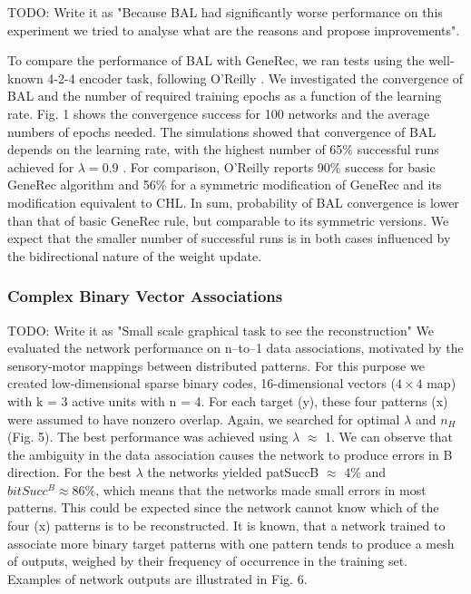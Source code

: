 TODO: Write it as "Because BAL had significantly worse performance on this experiment we tried to analyse what are the reasons and propose improvements". 

To compare the performance of BAL with GeneRec, we ran tests using the well-
known 4-2-4 encoder task, following O’Reilly \cite{o1996bio}. We investigated the convergence
of BAL and the number of required training epochs as a function of the learning
rate. Fig. 1 shows the convergence success for 100 networks and the average
numbers of epochs needed. The simulations showed that convergence of BAL
depends on the learning rate, with the highest number of 65\% successful runs
achieved for $\lambda = 0.9$ \cite{farkas2013bal}. For comparison, O’Reilly \cite{o1996bio} reports 90\% success for basic GeneRec algorithm and 56\% for a symmetric modification of GeneRec and its
modification equivalent to CHL. In sum, probability of BAL convergence is lower
than that of basic GeneRec rule, but comparable to its symmetric versions. We
expect that the smaller number of successful runs is in both cases influenced by
the bidirectional nature of the weight update.

\subsubsection{Complex Binary Vector Associations} 

TODO: Write it as "Small scale graphical task to see the reconstruction" 
We evaluated the network performance on n–to–1 data associations, motivated
by the sensory-motor mappings between distributed patterns. For this purpose
we created low-dimensional sparse binary codes, 16-dimensional vectors ($4 \times 4$
map) with k = 3 active units with n = 4. For each target (y), these four
patterns (x) were assumed to have nonzero overlap. Again, we searched for
optimal $\lambda$ and $n_H$ (Fig. 5). The best performance was achieved using $\lambda$ $\approx$ 1. We
can observe that the ambiguity in the data association causes the network to
produce errors in B direction. For the best $\lambda$ the networks yielded patSuccB $\approx$
4\% and $bitSucc^B \approx 86\%$, which means that the networks made small errors in
most patterns. This could be expected since the network cannot know which of
the four (x) patterns is to be reconstructed. It is known, that a network trained
to associate more binary target patterns with one pattern tends to produce a
mesh of outputs, weighed by their frequency of occurrence in the training set.
Examples of network outputs are illustrated in Fig. 6.

